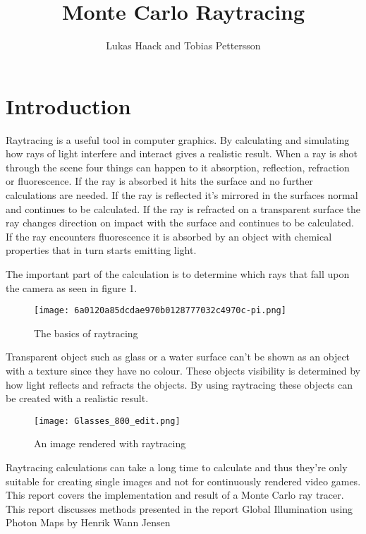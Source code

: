 \documentclass[a4paper,12pt]{IEEEtran}
\begin{document}
\title{Monte Carlo Raytracing}

\author{ Lukas Haack and Tobias Pettersson}

\maketitle



\section{Introduction}
Raytracing is a useful tool in computer graphics. By calculating and simulating how rays of light interfere and interact gives a realistic result. When a ray is shot through the scene four things can happen to it absorption, reflection, refraction or fluorescence.
If the ray is absorbed it hits the surface and no further calculations are needed. If the ray is reflected it's mirrored in the surfaces normal and continues to be calculated. If the ray is refracted on a transparent surface the ray changes direction on impact with the surface and continues to be calculated. If the ray encounters fluorescence it is absorbed by an object with chemical properties that in turn starts emitting light.

The important part of the calculation is to determine which rays that fall upon the camera as seen in figure 1. 
\begin{figure}[h!]
\texttt{[image: 6a0120a85dcdae970b0128777032c4970c-pi.png]}
\caption{The basics of raytracing}
\end{figure}
Transparent object such as glass or a water surface can't be shown as an object with a texture since they have no colour. 
These objects visibility is determined by how light reflects and refracts the objects. By using raytracing these objects can be created with a realistic result.

\begin{figure}[h!]
\texttt{[image: Glasses\_800\_edit.png]}
\caption{An image rendered with raytracing}
\end{figure}

Raytracing calculations can take a long time to calculate and thus they're only suitable for creating single images and not for continuously rendered video games. 
This report covers the implementation and result of a Monte Carlo ray tracer.
This report discusses methods presented in the report Global Illumination using Photon Maps by Henrik Wann Jensen
\end{document}
